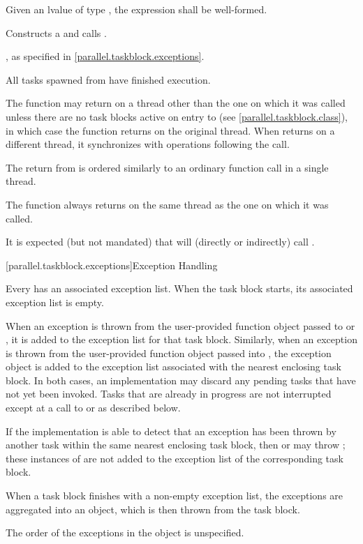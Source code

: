 \begin{itemdescr}
\pnum
\requires Given an lvalue  of type , the expression  shall be well-formed.

\pnum
\effects Constructs a   and calls .

\pnum
\throws {}, as specified in \ref{parallel.taskblock.exceptions}.

\pnum
\postconditions All tasks spawned from  have finished execution.

\pnum
\remarks The  function may return on a thread
other than the one on which it was called unless there are no task blocks
active on entry to  (see
    \ref{parallel.taskblock.class}), in which case the function returns on the
original thread. When  returns on a different thread, it
synchronizes with operations following the call. \begin{note}The return from
 is ordered similarly to an ordinary function
call in a single thread.\end{note} The 
function always returns on the same thread as the one on which it was called.

\pnum
\realnotes It is expected (but not mandated) that  will (directly or indirectly) call .
\end{itemdescr}

[parallel.taskblock.exceptions]{Exception Handling}

\pnum
Every  has an associated exception list. When the task block starts, its associated exception list is empty.

\pnum
When an exception is thrown from the user-provided function object passed
to  or , it is
added to the exception list for that task block. Similarly, when an exception
is thrown from the user-provided function object passed into
, the exception object is added to the exception list
associated with the nearest enclosing task block. In both cases, an
implementation may discard any pending tasks that have not yet been invoked.
Tasks that are already in progress are not interrupted except at a call to
 or  as described below.

\pnum
If the implementation is able to detect that an exception has been thrown
by another task within the same nearest enclosing task block, then
 or  may throw
; these instances of
 are not added to the exception list of the
corresponding task block.

\pnum
When a task block finishes with a non-empty exception list, the
exceptions are aggregated into an  object, which is then thrown
from the task block.

\pnum
The order of the exceptions in the  object is unspecified.

